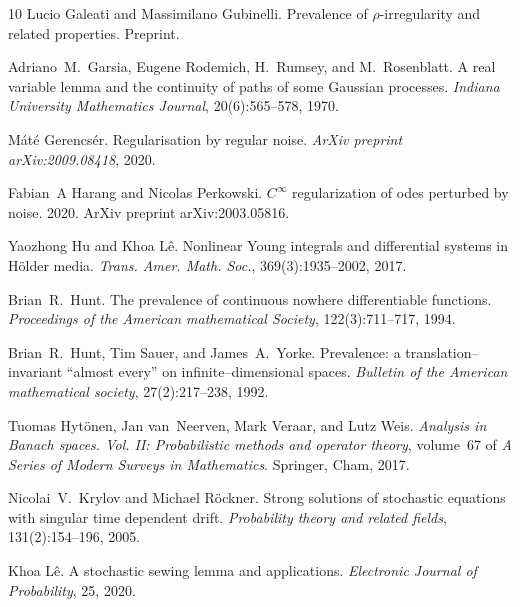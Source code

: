 \documentclass[10pt]{article}
\newcommand{\tmtextit}[1]{{\itshape{#1}}}
\begin{document}
\begin{thebibliography}{10}
  Lucio Galeati  and  Massimilano Gubinelli.
  {\newblock}Prevalence of $\rho$-irregularity and related properties.
  {\newblock}Preprint.{\newblock}
  
  Adriano~M.~Garsia, Eugene Rodemich, H.~Rumsey, and 
  M.~Rosenblatt. {\newblock}A real variable lemma and the continuity of paths
  of some Gaussian processes. {\newblock}\tmtextit{Indiana University
  Mathematics Journal}, 20(6):565--578, 1970.{\newblock}
  
  M{\'a}t{\'e} Gerencs{\'e}r.
  {\newblock}Regularisation by regular noise. {\newblock}\tmtextit{ArXiv
  preprint arXiv:2009.08418}, 2020.{\newblock}
  
  Fabian~A Harang  and  Nicolas Perkowski.
  {\newblock}$C^{\infty}$ regularization of odes perturbed by noise.
  {\newblock}2020. {\newblock}ArXiv preprint arXiv:2003.05816.{\newblock}
  
  Yaozhong Hu  and  Khoa L{\^e}. {\newblock}Nonlinear Young
  integrals and differential systems in H{\"o}lder media.
  {\newblock}\tmtextit{Trans. Amer. Math. Soc.}, 369(3):1935--2002,
  2017.{\newblock}
  
  Brian~R.~Hunt. {\newblock}The prevalence of continuous
  nowhere differentiable functions. {\newblock}\tmtextit{Proceedings of the
  American mathematical Society}, 122(3):711--717, 1994.{\newblock}
  
  Brian~R.~Hunt, Tim Sauer, and  James~A.~Yorke.
  {\newblock}Prevalence: a translation--invariant ``almost every'' on
  infinite--dimensional spaces. {\newblock}\tmtextit{Bulletin of the American
  mathematical society}, 27(2):217--238, 1992.{\newblock}
  
  Tuomas Hyt{\"o}nen, Jan van~Neerven, Mark Veraar, and 
  Lutz Weis. {\newblock}\tmtextit{Analysis in Banach spaces. Vol. II:
  Probabilistic methods and operator theory},  volume~67  of \tmtextit{A
  Series of Modern Surveys in Mathematics}. {\newblock}Springer, Cham,
  2017.{\newblock}
  
  Nicolai~V.~Krylov  and  Michael R{\"o}ckner.
  {\newblock}Strong solutions of stochastic equations with singular time
  dependent drift. {\newblock}\tmtextit{Probability theory and related
  fields}, 131(2):154--196, 2005.{\newblock}
  
  Khoa L{\^e}. {\newblock}A stochastic sewing lemma and
  applications. {\newblock}\tmtextit{Electronic Journal of Probability}, 25,
  2020.{\newblock}
  

\end{thebibliography}
\end{document}
